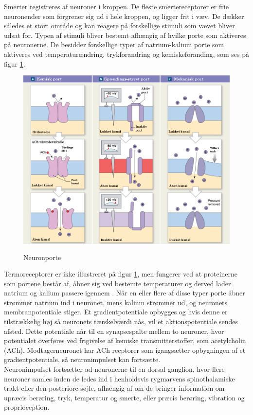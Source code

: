 Smerter registreres af neuroner i kroppen. De fleste smertereceptorer er frie neuronender som forgrener sig ud i hele kroppen, og ligger frit i væv. De dækker således et stort område og kan reagere på forskellige stimuli som vævet bliver udsat for. Typen af stimuli bliver bestemt afhængig af hvilke porte som aktiveres på neuronerne. De besidder forskellige typer af natrium-kalium porte som aktiveres ved temperaturændring, trykforandring og kemiskeforanding, som ses på figur \ref{neuronport}.

\begin{figure}[H]
	\caption{Neuronporte}
	\label{neuronport}
	\centering
	\includegraphics[scale=.8]{figures/neuronport}
	\flushleft
	\textit{\citep{Martini}}
\end{figure}

Termoreceptorer er ikke illustreret på figur \ref{neuronport}, men fungerer ved at proteinerne som portene består af, åbner sig ved bestemte temperaturer og derved lader natrium og kalium passere igennem \citep{kimball}. 
Når en eller flere af disse typer porte åbner strømmer natrium ind i neuronet, mens kalium strømmer ud, og neuronets membranpotentiale stiger. Et gradientpotentiale opbygges og hvis denne er tilstrækkelig høj så neuronets tærskelværdi nås, vil et aktionspotentiale sendes afsted. Dette potentiale når til en synapsespalte mellem to neuroner, hvor potentialet overføres ved frigivelse af kemiske transmitterstoffer, som acetylcholin (ACh). Modtagerneuronet har ACh recptorer som igangsætter opbygningen af et gradientpotentiale, så neuronimpulset kan fortsætte. \\
Neuronimpulset fortsætter ad neuronerne til en dorsal ganglion, hvor flere neuroner samles inden de ledes ind i henholdsvis rygmarvens spinothalamiske trakt eller den posteriore søjle, afhængig af om de bringer information om upræcis berøring, tryk, temperatur og smerte, eller præcis berøring, vibration og proprioception. \citep{Martini}

